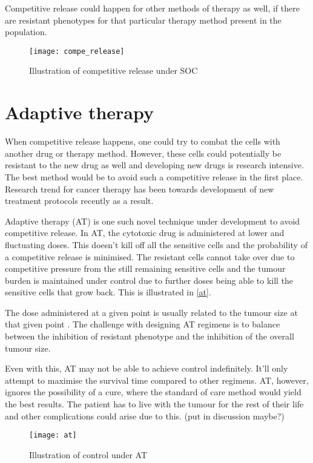 Competitive release could happen for other methods of therapy as well, if there are resistant phenotypes for that particular therapy method present in the population.

\begin{figure}[h]
  \centering
  \texttt{[image: compe\_release]}
  \caption{Illustration of competitive release under SOC}
  \label{comperelease}
\end{figure}

\section{Adaptive therapy}
When competitive release happens, one could try to combat the cells with another drug or therapy method. However, these cells could potentially be resistant to the new drug as well and developing new drugs is research intensive. The best method would be to avoid such a competitive release in the first place. Research trend for cancer therapy has been towards development of new treatment protocols recently as a result.

Adaptive therapy (AT) is one such novel technique under development to avoid competitive release. In AT, the cytotoxic drug is administered at lower and fluctuating doses. This doesn't kill off all the sensitive cells and the probability of a competitive release is minimised. The resistant cells cannot take over due to competitive pressure from the still remaining sensitive cells and the tumour burden is maintained under control due to further doses being able to kill the sensitive cells that grow back. This is illustrated in \autoref{at}.

The dose administered at a given point is usually related to the tumour size at that given point \cite{Gatenby}. The challenge with designing AT regimens is to balance between the inhibition of resistant phenotype and the inhibition of the overall tumour size.

Even with this, AT may not be able to achieve control indefinitely. It'll only attempt to maximise the survival time compared to other regimens. AT, however, ignores the possibility of a cure, where the standard of care method would yield the best results. The patient has to live with the tumour for the rest of their life and other complications could arise due to this.
(put in discussion maybe?)

\begin{figure}[h]
  \centering
  \texttt{[image: at]}
  \caption{Illustration of control under AT}
  \label{at}
\end{figure}

